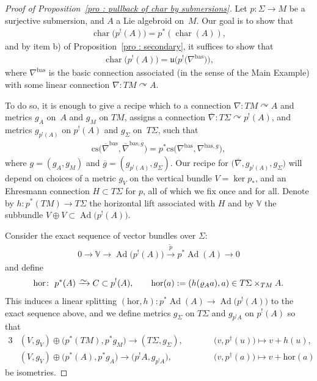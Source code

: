 \documentclass[11pt]{article}
\numberwithin{equation}{section}
\newcommand{\diffto}{\xrightarrow{\raisebox{-0.2 em}[0pt][0pt]{\smash{\ensuremath{\sim}}}}}
\newcommand{\rmap}{\longrightarrow}
\newcommand{\acts}{\curvearrowright}
\newcommand{\8}{\infty}
\begin{document}
\begin{proof}[Proof of Proposition~\ref{pro : pullback of char by submersions}] Let $p\colon \Sigma \to M$ be a surjective submersion, and $A$ a Lie algebroid on~$M$. Our goal is to show that\begin{gather*}\operatorname{char}\big(p^!(A)\big) = p^*(\operatorname{char}(A)),\end{gather*}and by item b) of Proposition~\ref{pro : secondary}, it suffices to show that\begin{gather*}\operatorname{char}\big(p^!(A)\big)=\mathfrak{u}\big(p^!\big(\nabla^{\mathrm{bas}}\big)\big),\end{gather*}where $\nabla^{\mathrm{bas}}$ is the basic connection associated (in the sense of the Main Example) with some linear connection $\nabla\colon TM \acts A$.

 To do so, it is enough to give a recipe which to a connection $\nabla\colon TM \acts A$ and metrics $g_A$ on~$A$ and $g_M$ on $TM$, assigns a connection $\overline{\nabla}\colon T\Sigma \acts p^!(A)$, and metrics $g_{p^!(A)}$ on $p^!(A)$ and $g_{\Sigma}$ on~$T\Sigma$, such that
\begin{gather}\label{ast-ast}
 \mathrm{cs}\big(\overline{\nabla}^{\mathrm{bas}},\overline{\nabla}^{\mathrm{bas},\overline{g}}\big) = p^*\mathrm{cs}\big(\nabla^{\mathrm{bas}},\nabla^{\mathrm{bas},g}\big),
\end{gather}where $g=(g_{A},g_{M})$ and $\overline{g}=(g_{p^!(A)},g_{\Sigma})$. Our recipe for $\big(\overline{\nabla},g_{p^!(A)},g_{\Sigma}\big)$ will depend on choices of a metric $g_V$ on the vertical bundle $V=\ker p_*$, and an Ehresmann connection $H \subset T\Sigma$ for $p$, all of which we fix once and for all. Denote by $h\colon p^*(TM) \to T\Sigma$ the horizontal lift associated with $H$ and by $\mathbb{V}$ the subbundle $V \oplus V \subset \operatorname{Ad}\big(p^!(A)\big)$.

Consider the exact sequence of vector bundles over $\Sigma$:
\begin{gather*}
0 \rmap \mathbb{V} \rmap \operatorname{Ad}\big(p^!(A)\big) \stackrel{\widetilde{p}}{\rmap} p^*\operatorname{Ad}(A) \rmap 0
\end{gather*}and define
\begin{gather*}
 \mathrm{hor}\colon \ p^*(A) \diffto C \subset p^!(A), \qquad \mathrm{hor}(a):=(h(\varrho_A a),a) \in T\Sigma \times_{TM}A.
\end{gather*}This induces a linear splitting $(\mathrm{hor},h)\colon p^*\operatorname{Ad}(A) \to \operatorname{Ad}\big(p^!(A)\big)$ to the exact sequence above, and we define metrics $g_{\Sigma}$ on $T\Sigma$ and $g_{p^!A}$ on $p^!(A)$ so that
 \begin{alignat*}{3}
 & (V,g_V) \oplus \big(p^*(TM),p^*g_M\big) \rmap (T\Sigma,g_{\Sigma}), \qquad && \big(v,p^{\dagger}(u)\big) \mapsto v+h(u), &\\
 & (V,g_V) \oplus \big(p^*(A),p^*g_A\big) \rmap \big(p^!A,g_{p^!A}\big),\qquad && \big(v,p^{\dagger}(a)\big) \mapsto v+\mathrm{hor}(a) &
 \end{alignat*}be isometries.


\end{proof}
\end{document}
